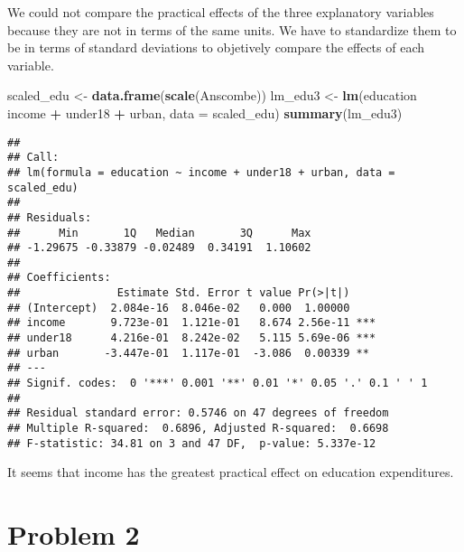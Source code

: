 \documentclass[
]{article}
\newenvironment{Shaded}{\begin{snugshade}}{\end{snugshade}}
\newcommand{\DataTypeTok}[1]{\textcolor[rgb]{0.13,0.29,0.53}{#1}}
\newcommand{\KeywordTok}[1]{\textcolor[rgb]{0.13,0.29,0.53}{\textbf{#1}}}
\newcommand{\NormalTok}[1]{#1}
\newcommand{\OperatorTok}[1]{\textcolor[rgb]{0.81,0.36,0.00}{\textbf{#1}}}
\newcommand{\StringTok}[1]{\textcolor[rgb]{0.31,0.60,0.02}{#1}}
\begin{document}
We could not compare the practical effects of the three explanatory
variables because they are not in terms of the same units. We have to
standardize them to be in terms of standard deviations to objetively
compare the effects of each variable.

\begin{Shaded}
\begin{Highlighting}[]
\NormalTok{scaled_edu <-}\StringTok{ }\KeywordTok{data.frame}\NormalTok{(}\KeywordTok{scale}\NormalTok{(Anscombe))}
\NormalTok{lm_edu3 <-}\StringTok{ }\KeywordTok{lm}\NormalTok{(education }\OperatorTok{~}\StringTok{ }\NormalTok{income }\OperatorTok{+}\StringTok{ }\NormalTok{under18 }\OperatorTok{+}\StringTok{ }\NormalTok{urban, }\DataTypeTok{data =}\NormalTok{ scaled_edu)}
\KeywordTok{summary}\NormalTok{(lm_edu3)}
\end{Highlighting}
\end{Shaded}

\begin{verbatim}
## 
## Call:
## lm(formula = education ~ income + under18 + urban, data = scaled_edu)
## 
## Residuals:
##      Min       1Q   Median       3Q      Max 
## -1.29675 -0.33879 -0.02489  0.34191  1.10602 
## 
## Coefficients:
##               Estimate Std. Error t value Pr(>|t|)    
## (Intercept)  2.084e-16  8.046e-02   0.000  1.00000    
## income       9.723e-01  1.121e-01   8.674 2.56e-11 ***
## under18      4.216e-01  8.242e-02   5.115 5.69e-06 ***
## urban       -3.447e-01  1.117e-01  -3.086  0.00339 ** 
## ---
## Signif. codes:  0 '***' 0.001 '**' 0.01 '*' 0.05 '.' 0.1 ' ' 1
## 
## Residual standard error: 0.5746 on 47 degrees of freedom
## Multiple R-squared:  0.6896, Adjusted R-squared:  0.6698 
## F-statistic: 34.81 on 3 and 47 DF,  p-value: 5.337e-12
\end{verbatim}

It seems that income has the greatest practical effect on education
expenditures.

\hypertarget{problem-2}{%
\section{Problem 2}\label{problem-2}}

\begin{Shaded}
\end{Shaded}
\end{document}
